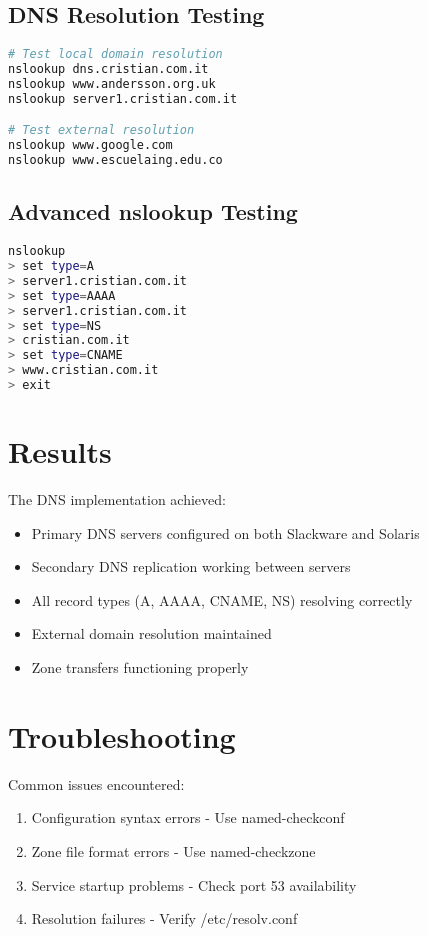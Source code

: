 \documentclass[12pt,a4paper]{article}
\begin{document}
\subsection{DNS Resolution Testing}
\begin{lstlisting}[language=bash]
# Test local domain resolution
nslookup dns.cristian.com.it
nslookup www.andersson.org.uk
nslookup server1.cristian.com.it

# Test external resolution
nslookup www.google.com
nslookup www.escuelaing.edu.co
\end{lstlisting}

\subsection{Advanced nslookup Testing}
\begin{lstlisting}[language=bash]
nslookup
> set type=A
> server1.cristian.com.it
> set type=AAAA
> server1.cristian.com.it
> set type=NS
> cristian.com.it
> set type=CNAME
> www.cristian.com.it
> exit
\end{lstlisting}

\section{Results}

The DNS implementation achieved:
\begin{itemize}
    \item Primary DNS servers configured on both Slackware and Solaris
    \item Secondary DNS replication working between servers
    \item All record types (A, AAAA, CNAME, NS) resolving correctly
    \item External domain resolution maintained
    \item Zone transfers functioning properly
\end{itemize}

\section{Troubleshooting}

Common issues encountered:
\begin{enumerate}
    \item Configuration syntax errors - Use named-checkconf
    \item Zone file format errors - Use named-checkzone
    \item Service startup problems - Check port 53 availability
    \item Resolution failures - Verify /etc/resolv.conf
\end{enumerate}
\end{document}
